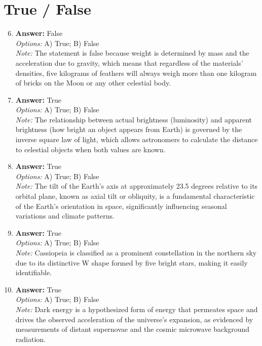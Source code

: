 \documentclass[12pt]{article}
\begin{document}
\section*{True / False}
\begin{enumerate}[label=\arabic*.]
\setcounter{enumi}{5}
\item \textbf{Answer:} False
\\ \textit{Options:} A) True; B) False
\\ \textit{Note:} The statement is false because weight is determined by mass and the acceleration due to gravity, which means that regardless of the materials' densities, five kilograms of feathers will always weigh more than one kilogram of bricks on the Moon or any other celestial body.
\item \textbf{Answer:} True
\\ \textit{Options:} A) True; B) False
\\ \textit{Note:} The relationship between actual brightness (luminosity) and apparent brightness (how bright an object appears from Earth) is governed by the inverse square law of light, which allows astronomers to calculate the distance to celestial objects when both values are known.
\item \textbf{Answer:} True
\\ \textit{Options:} A) True; B) False
\\ \textit{Note:} The tilt of the Earth's axis at approximately 23.5 degrees relative to its orbital plane, known as axial tilt or obliquity, is a fundamental characteristic of the Earth's orientation in space, significantly influencing seasonal variations and climate patterns.
\item \textbf{Answer:} True
\\ \textit{Options:} A) True; B) False
\\ \textit{Note:} Cassiopeia is classified as a prominent constellation in the northern sky due to its distinctive W shape formed by five bright stars, making it easily identifiable.
\item \textbf{Answer:} True
\\ \textit{Options:} A) True; B) False
\\ \textit{Note:} Dark energy is a hypothesized form of energy that permeates space and drives the observed acceleration of the universe's expansion, as evidenced by measurements of distant supernovae and the cosmic microwave background radiation.
\end{enumerate}
\end{document}
